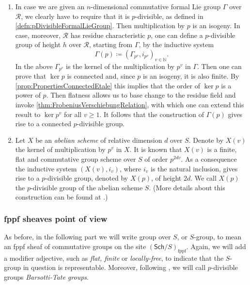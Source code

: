 \begin{ex}
\begin{enumerate}
\item In case we are given an $n$-dimensional commutative\label{ex:ConnectedpDivGroupFLG}
	formal Lie group $\Gamma$ over $\mathscr{R}$, we clearly have to require that it is $p$-divisible,
	as defined in \cref{defn:pDivisibleFormalLieGroup}.
	Then multiplication by $p$ is an isogeny.
	In case, moreover, $\mathscr{R}$ has residue characteristic $p$,
	one can define a $p$-divisible group of height $h$
	over $\mathscr{R}$, starting from $\Gamma$, by the inductive system
	\begin{equation*}
		\Gamma(p) \coloneqq \left(\Gamma_{p^v}, i_{p^v}\right)_{ v \in \mathbb{N} }
	.\end{equation*} 
	In the above $\Gamma_{p^v}$ is the kernel of
	the multiplication by $p^v$ in $\Gamma$.
	Then one can prove that $\ker p$ is connected and,
	since $p$ is an isogeny, it is also finite.
	By \cref{prop:PropertiesConnectedEtale} this implies that
	the order of $\ker p$ is a power of $p$.
	Then flatness allows us to base change to the residue field and invoke
	\cref{thm:FrobeniusVerschiebungRelation}, with which one can extend 
	this result to $\ker p^v$ for all $v \geq 1$.
	It follows that the construction of $\Gamma(p)$
	gives rise to a connected $p$-divisible group.

\item Let \(X\) be an \emph{abelian scheme} of relative dimension \(d\)
	over \(S\).
	Denote by \(X(v)\) the kernel of multiplication by \(p^v\)
	in \(X\).
	It is known that \(X(v)\) is a finite, flat and commutative
	group scheme over \(S\) of order \(p^{ 2dv }\).
	As a consequence the inductive system \(\left(X(v), i_v\right)\),
	where \(i_v\) is the natural inclusion, gives rise to
	a \(p\)-divisible group, denoted by \(X(p)\),
	of height \(2d\).
	We call \(X(p)\) the \(p\)-divisible group
	of the abelian scheme \(S\).
	(More details about this construction
	can be found at \cite[\S6]{Shatz}.)
\end{enumerate}
\end{ex}



\subsubsection{fppf sheaves point of view}
As before, in the following part we will write group over $S$, or $S$-group, to mean
an fppf sheaf of commutative groups on the site $(\mathsf{Sch}/S)_{\mathrm{fppf}}$.
Again, we will add a modifier adjective, such as \emph{flat, finite} or \emph{locally-free},
to indicate that the \(S\)-group in question is representable.
Moreover, following \cite{Messing}, we will call $p$-divisible groups
\emph{Barsotti-Tate groups}.



